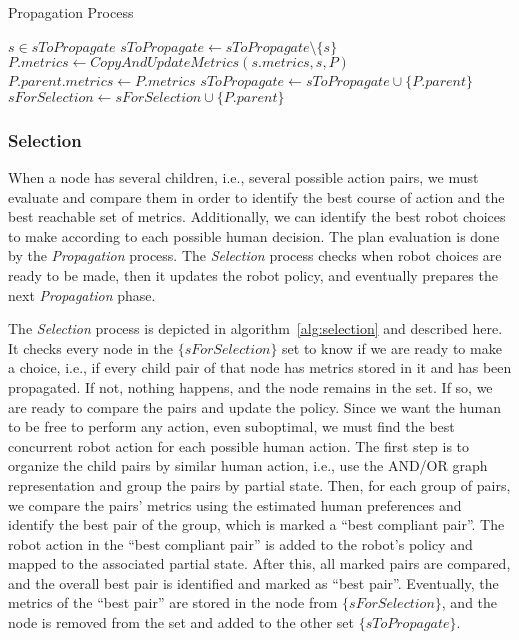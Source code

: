 \begin{algorithm}[h]
\caption{Propagation Process}\label{alg:propagation}
\begin{algorithmic}[1]

    \State $s \in sToPropagate$
    \State $sToPropagate \gets sToPropagate \setminus \{s\}$
        \State $P.metrics \gets CopyAndUpdateMetrics(s.metrics, s, P)$
            \State $P.parent.metrics \gets P.metrics$
            \State $sToPropagate \gets sToPropagate \cup \{P.parent\}$
        \Else
            \State $sForSelection \gets sForSelection \cup \{P.parent\}$
        \EndIf
    \EndFor
\EndWhile

\end{algorithmic}
\end{algorithm}


    \subsubsection{Selection}

When a node has several children, i.e., several possible action pairs, we must evaluate and compare them in order to identify the best course of action and the best reachable set of metrics. Additionally, we can identify the best robot choices to make according to each possible human decision. 
The plan evaluation is done by the \textit{Propagation} process. The \textit{Selection} process checks when robot choices are ready to be made, then it updates the robot policy, and eventually prepares the next \textit{Propagation} phase. 

The \textit{Selection} process is depicted in algorithm~\ref{alg:selection} and described here. It checks every node in the $\{sForSelection\}$ set to know if we are ready to make a choice, i.e., if every child pair of that node has metrics stored in it and has been propagated. 
If not, nothing happens, and the node remains in the set.
If so, we are ready to compare the pairs and update the policy. Since we want the human to be free to perform any action, even suboptimal, we must find the best concurrent robot action for each possible human action. The first step is to organize the child pairs by similar human action, i.e., use the AND/OR graph representation and group the pairs by partial state. Then, for each group of pairs, we compare the pairs' metrics using the estimated human preferences and identify the best pair of the group, which is marked a ``best compliant pair''. The robot action in the ``best compliant pair'' is added to the robot's policy and mapped to the associated partial state. After this, all marked pairs are compared, and the overall best pair is identified and marked as ``best pair''. Eventually, the metrics of the ``best pair'' are stored in the node from $\{sForSelection\}$, and the node is removed from the set and added to the other set $\{sToPropagate\}$.

